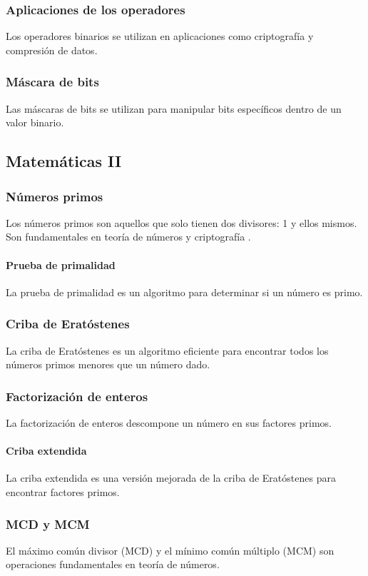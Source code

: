 \subsubsection{Aplicaciones de los operadores}
Los operadores binarios se utilizan en aplicaciones como criptografía y compresión de datos.
\subsubsection{Máscara de bits}
Las máscaras de bits se utilizan para manipular bits específicos dentro de un valor binario.

\subsection{Matemáticas II}
\subsubsection{Números primos}
Los números primos son aquellos que solo tienen dos divisores: 1 y ellos mismos. Son fundamentales en teoría de números y criptografía \cite{ahmed2020competitive}.
\paragraph{Prueba de primalidad}
La prueba de primalidad es un algoritmo para determinar si un número es primo.
\subsubsection{Criba de Eratóstenes}
La criba de Eratóstenes es un algoritmo eficiente para encontrar todos los números primos menores que un número dado.
\subsubsection{Factorización de enteros}
La factorización de enteros descompone un número en sus factores primos.
\paragraph{Criba extendida}
La criba extendida es una versión mejorada de la criba de Eratóstenes para encontrar factores primos.
\subsubsection{MCD y MCM}
El máximo común divisor (MCD) y el mínimo común múltiplo (MCM) son operaciones fundamentales en teoría de números.

